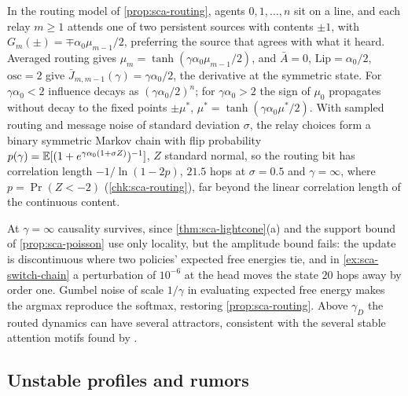 \begin{example}\label{ex:sca-switch-chain}
In the routing model of \cref{prop:sca-routing}, agents $0,1,\dots,n$ sit on a line, and each relay $m\ge1$ attends one of two persistent sources with contents $\pm1$, with $G_m(\pm)=\mp\alpha_0\mu_{m-1}/2$, preferring the source that agrees with what it heard. Averaged routing gives $\mu_m=\tanh(\gamma\alpha_0\mu_{m-1}/2)$, and $\bar A=0$, $\mathrm{Lip}=\alpha_0/2$, $\mathrm{osc}=2$ give $\bar J_{m,m-1}(\gamma)=\gamma\alpha_0/2$, the derivative at the symmetric state. For $\gamma\alpha_0<2$ influence decays as $(\gamma\alpha_0/2)^n$; for $\gamma\alpha_0>2$ the sign of $\mu_0$ propagates without decay to the fixed points $\pm\mu^\ast$, $\mu^\ast=\tanh(\gamma\alpha_0\mu^\ast/2)$. With sampled routing and message noise of standard deviation $\sigma$, the relay choices form a binary symmetric Markov chain with flip probability $p(\gamma)=\mathbb{E}[(1+e^{\gamma\alpha_0(1+\sigma Z)})^{-1}]$, $Z$ standard normal, so the routing bit has correlation length $-1/\ln(1-2p)$, $21.5$ hops at $\sigma=0.5$ and $\gamma=\infty$, where $p=\Pr(Z<-2)$ (\cref{chk:sca-routing}), far beyond the linear correlation length of the continuous content.
\end{example}

\begin{remark}\label{rem:sca-argmax}
At $\gamma=\infty$ causality survives, since \cref{thm:sca-lightcone}(a) and the support bound of \cref{prop:sca-poisson} use only locality, but the amplitude bound fails: the update is discontinuous where two policies' expected free energies tie, and in \cref{ex:sca-switch-chain} a perturbation of $10^{-6}$ at the head moves the state $20$ hops away by order one. Gumbel noise of scale $1/\gamma$ in evaluating expected free energy makes the argmax reproduce the softmax, restoring \cref{prop:sca-routing}. Above $\gamma_D$ the routed dynamics can have several attractors, consistent with the several stable attention motifs found by \citet{dennis2026communicating}.
\end{remark}

\subsection{Unstable profiles and rumors}\label{sup:sca-unstable-profiles-and-rumors}

